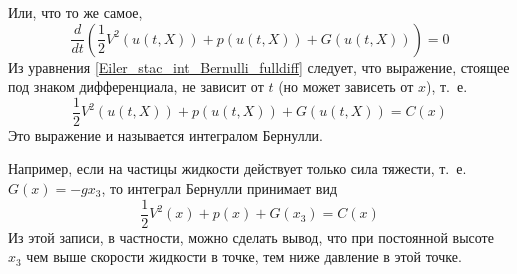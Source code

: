 Или, что то же самое,
\begin{equation*} \label{Eiler_stac_int_Bernulli_fulldiff}
	\frac{d}{dt}\left(\frac{1}{2} V^2(u(t,X)) + p(u(t,X)) + G (u(t,X))\right) = 0
\end{equation*}
Из уравнения \eqref{Eiler_stac_int_Bernulli_fulldiff} следует, что выражение,
стоящее под знаком дифференциала, не зависит от $t$ (но может зависеть от $x$), т.~е.
\begin{equation*} \label{int_Bernulli}
	\frac{1}{2} V^2(u(t,X)) + p(u(t,X)) + G (u(t,X)) = C(x)
\end{equation*}
Это выражение и называется интегралом Бернулли.

Например, если на частицы жидкости действует только сила тяжести,
т.~е. $G(x) = -gx_3$, то интеграл Бернулли принимает вид
\begin{equation*} \label{int_Bernulli}
	\frac{1}{2} V^2(x) + p(x) + G (x_3) = C(x)
\end{equation*}
Из этой записи, в частности, можно сделать вывод,
что при постоянной высоте $x_3$ чем выше скорости жидкости в точке,
тем ниже давление в этой точке.
